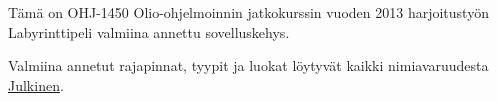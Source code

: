 Tämä on O\+H\+J-\/1450 Olio-\/ohjelmoinnin jatkokurssin vuoden 2013 harjoitustyön Labyrinttipeli valmiina annettu sovelluskehys.

Valmiina annetut rajapinnat, tyypit ja luokat löytyvät kaikki nimiavaruudesta {\ttfamily \hyperlink{namespace_julkinen}{Julkinen}}. 
